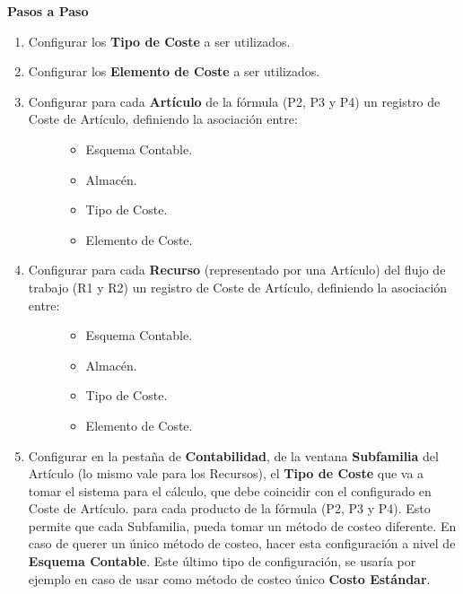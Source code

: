 \documentclass[letterpaper,10pt,spanish]{sphinxmanual}
\begin{document}
\textbf{Pasos a Paso}
\begin{enumerate}
\item {} 
Configurar los \textbf{Tipo de Coste} a ser utilizados.

\item {} 
Configurar los \textbf{Elemento de Coste} a ser utilizados.

\item {} \begin{description}
\item[{Configurar para cada \textbf{Artículo} de la fórmula (P2, P3 y P4) un registro de Coste de Artículo, definiendo la asociación entre:}] \leavevmode\begin{itemize}
\item {} 
Esquema Contable.

\item {} 
Almacén.

\item {} 
Tipo de Coste.

\item {} 
Elemento de Coste.

\end{itemize}

\end{description}

\item {} \begin{description}
\item[{Configurar para cada \textbf{Recurso} (representado por una Artículo) del flujo de trabajo (R1 y R2) un registro de Coste de Artículo, definiendo la asociación entre:}] \leavevmode\begin{itemize}
\item {} 
Esquema Contable.

\item {} 
Almacén.

\item {} 
Tipo de Coste.

\item {} 
Elemento de Coste.

\end{itemize}

\end{description}

\item {} 
Configurar en la pestaña de \textbf{Contabilidad}, de la ventana \textbf{Subfamilia} del Artículo (lo mismo vale para los Recursos), el \textbf{Tipo de Coste} que va a tomar el sistema para el cálculo, que debe coincidir con el configurado en Coste de Artículo. para cada producto de la fórmula (P2, P3 y P4). Esto permite que cada Subfamilia, pueda tomar un método de costeo diferente. En caso de querer un único método de costeo, hacer esta configuración a nivel de \textbf{Esquema Contable}. Este último tipo de configuración, se usaría por ejemplo en caso de usar como método de costeo único \textbf{Costo Estándar}.


\end{enumerate}
\end{document}
